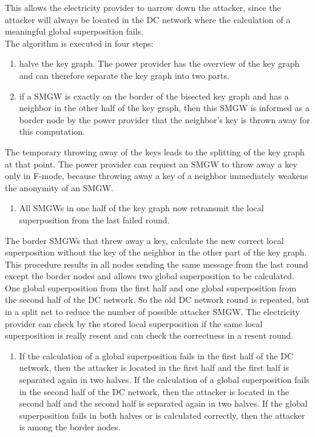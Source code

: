 This allows the electricity provider to narrow down the attacker, since the attacker will always be located in the DC network where the calculation of a meaningful global superposition fails.\\
The algorithm is executed in four steps:
\begin{enumerate}
\item halve the key graph. 
The power provider has the overview of the key graph and can therefore separate the key graph into two parts. %
\item if a SMGW is exactly on the border of the bisected key graph and has a neighbor in the other half of the key graph, then this SMGW is informed as a border node by the power provider that the neighbor's key is thrown away for this computation.
\end{enumerate}
The temporary throwing away of the keys leads to the splitting of the key graph at that point. The power provider can request an SMGW to throw away a key only in F-mode, because throwing away a key of a neighbor immediately weakens the anonymity of an SMGW. 
\begin{enumerate}[resume] 
\item All SMGWs in one half of the key graph now retransmit the local superposition from the last failed round. 
\end{enumerate}
The border SMGWs that threw away a key, calculate the new correct local superposition without the key of the neighbor in the other part of the key graph. This procedure results in all nodes sending the same message from the last round except the border nodes and allows two global superposition to be calculated. One global superposition from the first half and one global superposition from the second half of the DC network. So the old DC network round is repeated, but in a split net to reduce the number of possible attacker SMGW. The electricity provider can check by the stored local superposition if the same local superposition is really resent and can check the correctness in a resent round. 
\begin{enumerate}[resume]
\item If the calculation of a global superposition fails in the first half of the DC network, then the attacker is located in the first half and the first half is separated again in two halves. If the calculation of a global superposition fails in the second half of the DC network, then the attacker is located in the second half and the second half is separated again in two halves. If the global superposition fails in both halves or is calculated correctly, then the attacker is among the border nodes.
\end{enumerate}
